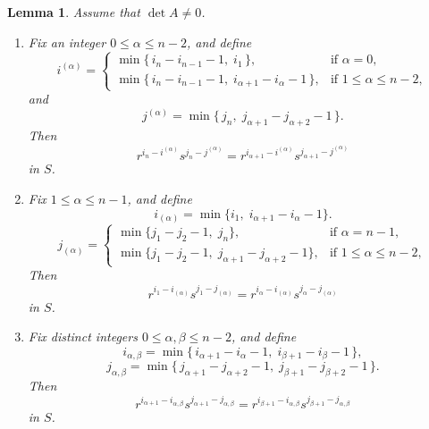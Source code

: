 \documentclass[11pt,reqno]{amsart}
\theoremstyle{plain}
\newtheorem{lem}[thm]{Lemma}
\theoremstyle{remark}
\theoremstyle{definition}
\begin{document}
\begin{lem}\label{n4-2}
Assume that $\det A\neq0$.
\begin{enumerate}
\item Fix an integer $0\leq\alpha\leq n-2$, and define
\[
i^{(\alpha)}
=
\begin{cases}
\min\{\,i_n-i_{n-1}-1,\; i_1\,\}, & \text{if }\alpha=0,\\[1mm]
\min\{\,i_n-i_{n-1}-1,\; i_{\alpha+1}-i_\alpha-1\,\}, & \text{if }1\leq\alpha\leq n-2,
\end{cases}
\]
and
\[
j^{(\alpha)}
=
\min\{\,j_n,\; j_{\alpha+1}-j_{\alpha+2}-1\,\}.
\]
Then
\[
r^{i_n-i^{(\alpha)}}s^{j_n-j^{(\alpha)}}
=
r^{i_{\alpha+1}-i^{(\alpha)}}s^{j_{\alpha+1}-j^{(\alpha)}}
\]
in $S$.

\item Fix $1\leq\alpha\leq n-1$, and define
\[
i_{(\alpha)}
=
\min\{ i_1,\; i_{\alpha+1}-i_{\alpha}-1\}.
\]\[
j_{(\alpha)}
=
\begin{cases}
\min\{ j_1-j_2-1,\; j_{n}\}, & \text{if }\alpha=n-1,\\[1mm]
\min\{ j_1-j_2-1,\; j_{\alpha+1}-j_{\alpha+2}-1\},& \text{if }1\leq\alpha\leq n-2,
\end{cases}\]
Then
\[
r^{i_1-i_{(\alpha)}}s^{j_1-j_{(\alpha)}}
=
r^{i_\alpha-i_{(\alpha)}}s^{j_\alpha-j_{(\alpha)}}
\] in $S$.

\item Fix distinct integers $0\leq\alpha,\beta\leq n-2$, and define
 \[
i_{\alpha,\beta}
=
\min\{\,i_{\alpha+1}-i_\alpha-1,\;
i_{\beta+1}-i_\beta-1\,\},
\]
\[
j_{\alpha,\beta}
=
\min\{\,j_{\alpha+1}-j_{\alpha+2}-1,\;
j_{\beta+1}-j_{\beta+2}-1\,\}.
\]
Then
\[
r^{i_{\alpha+1}-i_{\alpha,\beta}}
s^{j_{\alpha+1}-j_{\alpha,\beta}}
=
r^{i_{\beta+1}-i_{\alpha,\beta}}
s^{j_{\beta+1}-j_{\alpha,\beta}}
\]
in $S$.
\end{enumerate}
\end{lem}
\end{document}
